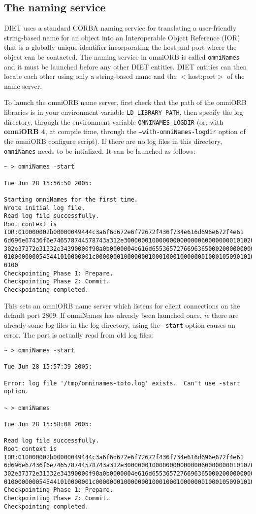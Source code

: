 \subsection{The naming service}

DIET uses a standard CORBA naming service for translating a
user-friendly string-based name for an object into an Interoperable
Object Reference (IOR) that is a globally unique identifier
incorporating the host and port where the object can be contacted.
The naming service in omniORB is called \texttt{omniNames} and it
must be launched before any other DIET entities.  DIET entities can
then locate each other using only a string-based name and the
$<$host:port$>$ of the name server.

To launch the omniORB name server, first check that the path of the omniORB
libraries is in your environment variable \texttt{LD\_LIBRARY\_PATH}, then
specify the log directory, through the environment variable
\texttt{OMNINAMES\_LOGDIR} (or, with \textbf{omniORB 4}, at compile time,
through the \texttt{--with-omniNames-logdir} option of the omniORB configure
script). If there are no log files in this directory,
\texttt{omniNames} needs to be intialized. It can be launched as
follows: 
{\footnotesize
\begin{verbatim}
~ > omniNames -start

Tue Jun 28 15:56:50 2005:

Starting omniNames for the first time.
Wrote initial log file.
Read log file successfully.
Root context is IOR:010000002b00000049444c3a6f6d672e6f72672f436f734e616d696e672f4e61
6d696e67436f6e746578744578743a312e300000010000000000000060000000010102000d0000003134
302e37372e31332e34390000f90a0b0000004e616d655365727669636500020000000000000008000000
0100000000545441010000001c0000000100000001000100010000000100010509010100010000000901
0100
Checkpointing Phase 1: Prepare.
Checkpointing Phase 2: Commit.
Checkpointing completed.
\end{verbatim}
}

This sets an omniORB name server which listens for client connections
on the default port 2809. If omniNames has already been launched once,
\emph{ie} there are already some log files in the log directory, using
the \texttt{-start} option causes an error. The port is actually read
from old log files: {\footnotesize
\begin{verbatim}
~ > omniNames -start

Tue Jun 28 15:57:39 2005:

Error: log file '/tmp/omninames-toto.log' exists.  Can't use -start option.

~ > omniNames  

Tue Jun 28 15:58:08 2005:

Read log file successfully.
Root context is IOR:010000002b00000049444c3a6f6d672e6f72672f436f734e616d696e672f4e61
6d696e67436f6e746578744578743a312e300000010000000000000060000000010102000d0000003134
302e37372e31332e34390000f90a0b0000004e616d655365727669636500020000000000000008000000
0100000000545441010000001c0000000100000001000100010000000100010509010100010000000901
Checkpointing Phase 1: Prepare.
Checkpointing Phase 2: Commit.
Checkpointing completed.
\end{verbatim}
}

